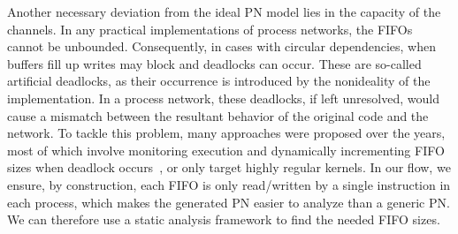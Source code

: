 \documentclass{sig-alternate}
\begin{document}
Another necessary deviation from the ideal PN model lies in the capacity of the channels.
In any practical implementations of process networks, the FIFOs cannot be unbounded.
Consequently, in cases with circular dependencies, when buffers fill up writes may block and deadlocks can occur. 
These are so-called artificial deadlocks, as their occurrence is introduced by the nonideality of the implementation. %
In a process network, %
these deadlocks, if left unresolved, would cause a mismatch between
the resultant behavior of the original code and the network. To tackle this problem, many approaches were proposed over the years, most of which involve monitoring execution and dynamically incrementing FIFO sizes when deadlock occurs~\cite{parks1995bounded}\cite{Geilen:2003:REK:1765712.1765736}\cite{4217338},
or only target highly regular kernels.
In our flow, we ensure, by construction, each FIFO is only read/written by a single instruction in each process, which makes the generated PN easier to analyze than a generic PN. We can therefore use a static analysis framework to find the needed FIFO sizes.

\end{document}
